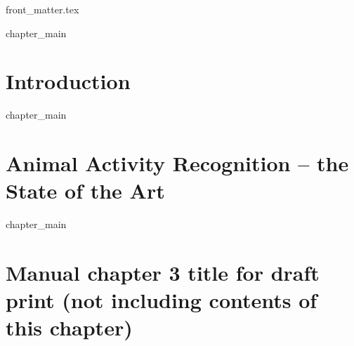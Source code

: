 \documentclass[cover]{dissertation}
\begin{document}
\sloppy
\def \myAuthorName{John Doe}
\def \myTitle{Your Title}
\def \mySubTitle{Optional subtitle}





\newcommand{\mainrq}{
\medskip
\textit{
How do you define a good research question? 
}
\medskip
}

\ifdraft
\else
    {front_matter.tex}
\fi

\tableofcontents
\ifdraft
\fi

\mainmatter
\thumbtrue

\chaponetrue
\chaptwotrue
\chapeighttrue


\ifchapone
    {chapter_main}
\else
    \chapter{Introduction} %
    \label{chapter:introduction}
\fi

\ifchaptwo
    {chapter_main}
\else
    \chapter{Animal Activity Recognition -- the State of the Art} %
    \label{chapter:state_of_the_art}
\fi

\ifchapthree
    {chapter_main}
\else
    \chapter{Manual chapter 3 title for draft print (not including contents of this chapter)}
    \label{chapter:your_chapter_title_when_not_included}
\fi
\end{document}
